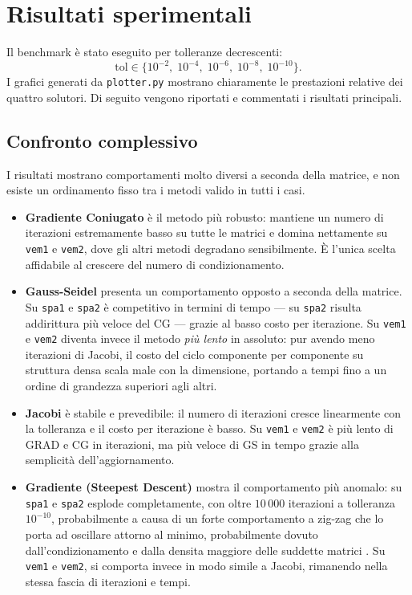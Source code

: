 \documentclass[a4paper,12pt]{article}
\begin{document}
\section{Risultati sperimentali}
Il benchmark è stato eseguito per tolleranze decrescenti:
\begin{equation}
    \text{tol} \in \{10^{-2},\; 10^{-4},\; 10^{-6},\; 10^{-8},\; 10^{-10}\}.
\end{equation}
I grafici generati da \texttt{plotter.py} mostrano chiaramente le prestazioni relative dei quattro solutori. Di seguito vengono riportati e commentati i risultati principali.

\subsection{Confronto complessivo}
I risultati mostrano comportamenti molto diversi a seconda della matrice,
e non esiste un ordinamento fisso tra i metodi valido in tutti i casi.

\begin{itemize}
    \item \textbf{Gradiente Coniugato} è il metodo più robusto: mantiene un
    numero di iterazioni estremamente basso su tutte le matrici e domina
    nettamente su \texttt{vem1} e \texttt{vem2}, dove gli altri metodi
    degradano sensibilmente. È l'unica scelta affidabile al crescere del
    numero di condizionamento.

    \item \textbf{Gauss-Seidel} presenta un comportamento opposto a seconda
    della matrice. Su \texttt{spa1} e \texttt{spa2} è competitivo in termini
    di tempo — su \texttt{spa2} risulta addirittura più veloce del CG — grazie
    al basso costo per iterazione. Su \texttt{vem1} e \texttt{vem2} diventa
    invece il metodo \emph{più lento} in assoluto: pur avendo meno iterazioni
    di Jacobi, il costo del ciclo componente per componente su struttura densa
    scala male con la dimensione, portando a tempi fino a un ordine di grandezza
    superiori agli altri.

    \item \textbf{Jacobi} è stabile e prevedibile: il numero di iterazioni
    cresce linearmente con la tolleranza e il costo per iterazione è basso.
    Su \texttt{vem1} e \texttt{vem2} è più lento di GRAD e CG in iterazioni,
    ma più veloce di GS in tempo grazie alla semplicità dell'aggiornamento.

    \item \textbf{Gradiente (Steepest Descent)} mostra il comportamento più
    anomalo: su \texttt{spa1} e \texttt{spa2} esplode completamente, con
    oltre $10\,000$ iterazioni a tolleranza $10^{-10}$, probabilmente a causa di un forte comportamento 
    a zig-zag che lo porta ad oscillare attorno al minimo, probabilmente dovuto dall'condizionamento e dalla densita maggiore delle suddette matrici .
    Su \texttt{vem1} e \texttt{vem2}, si comporta invece in modo simile a
    Jacobi, rimanendo nella stessa fascia di iterazioni e tempi.
\end{itemize}
\end{document}
